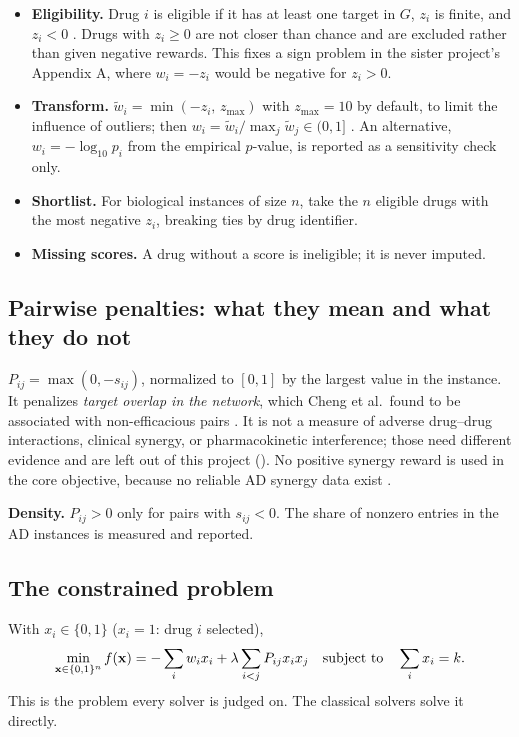 \begin{itemize}
\item \textbf{Eligibility.} Drug $i$ is eligible if it has at least one target in $G$, $z_i$ is finite, and $z_i<0$ \proposed. Drugs with $z_i\ge 0$ are not closer than chance and are excluded rather than given negative rewards. This fixes a sign problem in the sister project's Appendix A, where $w_i=-z_i$ would be negative for $z_i>0$.
\item \textbf{Transform.} $\tilde w_i=\min(-z_i,\,z_{\max})$ with $z_{\max}=10$ by default, to limit the influence of outliers; then $w_i=\tilde w_i/\max_j\tilde w_j\in(0,1]$ \proposed. An alternative, $w_i=-\log_{10}p_i$ from the empirical $p$-value, is reported as a sensitivity check only.
\item \textbf{Shortlist.} For biological instances of size $n$, take the $n$ eligible drugs with the most negative $z_i$, breaking ties by drug identifier.
\item \textbf{Missing scores.} A drug without a score is ineligible; it is never imputed.
\end{itemize}

\subsection{Pairwise penalties: what they mean and what they do not}

$P_{ij}=\max(0,-s_{ij})$, normalized to $[0,1]$ by the largest value in the instance. It penalizes \emph{target overlap in the network}, which Cheng et al.\ found to be associated with non-efficacious pairs \cite{cheng2019combinations}. It is not a measure of adverse drug--drug interactions, clinical synergy, or pharmacokinetic interference; those need different evidence and are left out of this project (). No positive synergy reward is used in the core objective, because no reliable AD synergy data exist \proposed.

\textbf{Density.} $P_{ij}>0$ only for pairs with $s_{ij}<0$. The share of nonzero entries in the AD instances is measured and reported.

\subsection{The constrained problem}

With $x_i\in\{0,1\}$ ($x_i=1$: drug $i$ selected),
\begin{equation}
\min_{\mathbf{x}\in\{0,1\}^n} f(\mathbf{x})=-\sum_{i}w_ix_i+\lambda\sum_{i<j}P_{ij}x_ix_j \quad\text{subject to}\quad \sum_i x_i=k.
\label{eq:constrained}
\end{equation}
This is the problem every solver is judged on. The classical solvers solve it directly.

